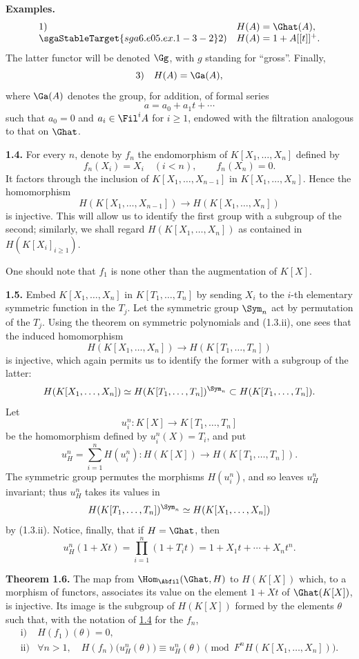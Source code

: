 \textbf{Examples.}
\[
\begin{array}{ll}
1)& H(A)=\Ghat(A),\\
\sgaStableTarget{sga6.e05.ex.1-3-2}2)& H(A)=1+A[[t]]^+.
\end{array}
\]
The latter functor will be denoted \(\Gg\), with \(g\) standing for ``gross''. Finally,
\[
3)\quad H(A)=\Ga(A),
\]
where \(\Ga(A)\) denotes the group, for addition, of formal series
\[
  a=a_0+a_1t+\cdots
\]
such that \(a_0=0\) and \(a_i\in\Fil^i A\) for \(i\geq 1\), endowed with the filtration analogous to that on \(\Ghat\).

\textbf{1.4.} For every \(n\), denote by \(f_n\) the endomorphism of \(K[X_1,\ldots,X_n]\) defined by
\[
  f_n(X_i)=X_i\quad (i<n),\qquad f_n(X_n)=0.
\]
It factors through the inclusion of \(K[X_1,\ldots,X_{n-1}]\) in \(K[X_1,\ldots,X_n]\). Hence the homomorphism
\[
  H(K[X_1,\ldots,X_{n-1}])\longrightarrow H(K[X_1,\ldots,X_n])
\]
is injective. This will allow us to identify the first group with a subgroup of the second; similarly, we shall regard \(H(K[X_1,\ldots,X_n])\) as contained in \(H(K[X_i]_{i\geq 1})\).

One should note that \(f_1\) is none other than the augmentation of \(K[X]\).

\textbf{1.5.} Embed \(K[X_1,\ldots,X_n]\) in \(K[T_1,\ldots,T_n]\) by sending \(X_i\) to the \(i\)-th elementary symmetric function in the \(T_j\). Let the symmetric group \(\Sym_n\) act by permutation of the \(T_j\). Using the theorem on symmetric polynomials and (1.3.ii), one sees that the induced homomorphism
\[
  H(K[X_1,\ldots,X_n])\longrightarrow H(K[T_1,\ldots,T_n])
\]
is injective, which again permits us to identify the former with a subgroup of the latter:
\[
  H(K[X_1,\ldots,X_n])\simeq H(K[T_1,\ldots,T_n])^{\Sym_n}
  \subset H(K[T_1,\ldots,T_n]).
\]
Let
\[
  u_i^n:K[X]\longrightarrow K[T_1,\ldots,T_n]
\]
be the homomorphism defined by \(u_i^n(X)=T_i\), and put
\[
  u_H^n=\sum_{i=1}^n H(u_i^n):H(K[X])\longrightarrow H(K[T_1,\ldots,T_n]).
\]
The symmetric group permutes the morphisms \(H(u_i^n)\), and so leaves \(u_H^n\) invariant; thus \(u_H^n\) takes its values in
\[
  H(K[T_1,\ldots,T_n])^{\Sym_n}
   \simeq H(K[X_1,\ldots,X_n])
\]
by (1.3.ii). Notice, finally, that if \(H=\Ghat\), then
\[
  u_H^n(1+Xt)=\prod_{i=1}^n(1+T_it)=1+X_1t+\cdots+X_nt^n.
\]

\textbf{Theorem 1.6.} The map from \(\Hom_{\Abfil}(\Ghat,H)\) to \(H(K[X])\) which, to a morphism of functors, associates its value on the element \(1+Xt\) of \(\Ghat(K[X])\), is injective. Its image is the subgroup of \(H(K[X])\) formed by the elements \(\theta\) such that, with the notation of \hyperlink{sga6.e05.para.1-4}{1.4} for the \(f_n\),
\[
\begin{array}{ll}
\text{i)}& H(f_1)(\theta)=0,\\[0.3em]
\text{ii)}& \forall n>1,\quad
 H(f_n)\bigl(u_H^n(\theta)\bigr)\equiv u_H^n(\theta)
 \pmod{F^nH(K[X_1,\ldots,X_n])}.
\end{array}
\]

